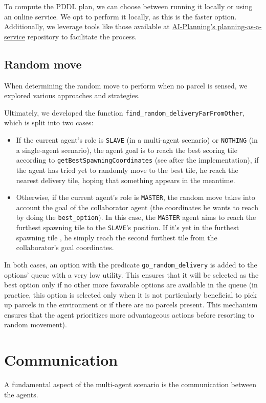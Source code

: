 \documentclass[12pt]{article}
\begin{document}
To compute the PDDL plan, we can choose between running it locally or using an online service. We opt to perform it locally, as this is the faster option. Additionally, we leverage tools like those available at \href{https://github.com/AI-Planning/planning-as-a-service}{AI-Planning's planning-as-a-service} repository to facilitate the process.
 

\subsection{Random move}

When determining the random move to perform when no parcel is sensed, we explored various approaches and strategies. 

Ultimately, we developed the function \texttt{find\_random\_deliveryFarFromOther}, which is split into two cases:

\begin{itemize}
\item If the current agent's role is \texttt{SLAVE} (in a multi-agent scenario) or \texttt{NOTHING} (in a single-agent scenario), the agent goal is to reach the best scoring tile according to \texttt{getBestSpawningCoordinates} (see after the implementation), if the agent has tried yet to randomly move to the best tile, he reach the nearest delivery tile, hoping that something appears in the meantime.
\item Otherwise, if the current agent's role is \texttt{MASTER}, the random move takes into account the goal of the collaborator agent (the coordinates he wants to reach by doing the \texttt{best\_option}). In this case, the \texttt{MASTER} agent aims to reach the furthest spawning tile to the \texttt{SLAVE}'s position. If it's yet in the furthest spawning tile , he simply reach the second furthest tile from the collaborator's goal coordinates.
\end{itemize}

In both cases, an option with the predicate \texttt{go\_random\_delivery} is added to the options' queue with a very low utility. This ensures that it will be selected as the best option only if no other more favorable options are available in the queue (in practice, this option is selected only when it is not particularly beneficial to pick up parcels in the environment or if there are no parcels present. This mechanism ensures that the agent prioritizes more advantageous actions before resorting to random movement).

\section{Communication}
A fundamental aspect of the multi-agent scenario is the communication between the agents.
\end{document}
